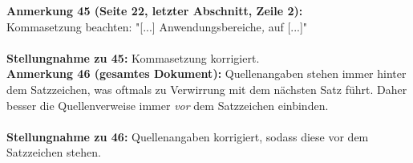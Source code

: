 \documentclass[a4paper,12pt]{book}
\begin{document}
\noindent
\textbf{Anmerkung 45 (Seite 22, letzter Abschnitt, Zeile 2):}\\
Kommasetzung beachten: "[...] Anwendungsbereiche\emph{,} auf [...]" \\
\\
\textbf{Stellungnahme zu 45:}
Kommasetzung korrigiert.
\\

\noindent
\textbf{Anmerkung 46 (gesamtes Dokument):}
Quellenangaben stehen immer hinter dem Satzzeichen, was oftmals zu Verwirrung mit dem nächsten Satz führt. Daher besser die Quellenverweise immer \emph{vor} dem Satzzeichen einbinden. \\
\\
\textbf{Stellungnahme zu 46:}
Quellenangaben korrigiert, sodass diese vor dem Satzzeichen stehen.
\\
\end{document}
